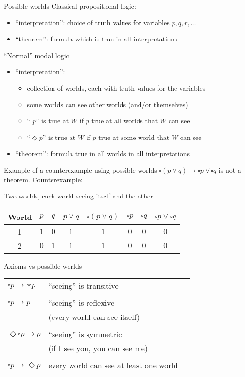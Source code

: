 \documentclass{beamer}
\newcommand{\nec}{\square}
\newcommand{\poss}{\Diamond}
\begin{document}
\begin{frame}{Possible worlds}
Classical propositional logic:
\begin{itemize}
\item ``interpretation'': choice of truth values for variables $p,q,r,\dotsc$
\item ``theorem'': formula which is true in all interpretations
\end{itemize}
\vfill
``Normal'' modal logic:
\begin{itemize}
\item ``interpretation'':
    \begin{itemize}
    \item collection of worlds, each with truth values for the variables
    \item some worlds can see other worlds (and/or themselves)
    \item ``$\nec p$'' is true at $W$ if $p$ true at all worlds that $W$ can see
    \item ``$\poss p$'' is true at $W$ if $p$ true at some world that $W$ can see
    \end{itemize}
\item ``theorem'': formula true in all worlds in all interpretations
\end{itemize}
\end{frame}

\begin{frame}{Example of a counterexample using possible worlds}
$\nec(p\lor q)\to\nec p\lor\nec q$ is not a theorem.
\vfill
Counterexample:

\addvspace{\baselineskip}
Two worlds, each world seeing itself and the other.

\addvspace{\baselineskip}
\begin{tabular}{c|cc|cc|ccc}
World & $p$ & $q$ & $p\lor q$ & $\nec (p\lor q)$ & $\nec p$ & $\nec q$ & $\nec p\lor\nec q$ \\
\hline
1 & $1$ & $0$ & $1$ & $1$ & $0$ & $0$ & $0$ \\
2 & $0$ & $1$ & $1$ & $1$ & $0$ & $0$ & $0$ \\
\end{tabular}
\end{frame}

\begin{frame}{Axioms vs possible worlds}

\begin{tabular}{lll}
$\nec p \to \nec\nec p$ & ``seeing'' is transitive \\
\\
$\nec p \to p$ & ``seeing'' is reflexive \\
    & (every world can see itself) \\
\\
$\poss\nec p \to p$ & ``seeing'' is symmetric \\
    & (if I see you, you can see me) \\
\\
$\nec p \to \poss p$
    & every world can see at least one world
\end{tabular}

\end{frame}
\end{document}

